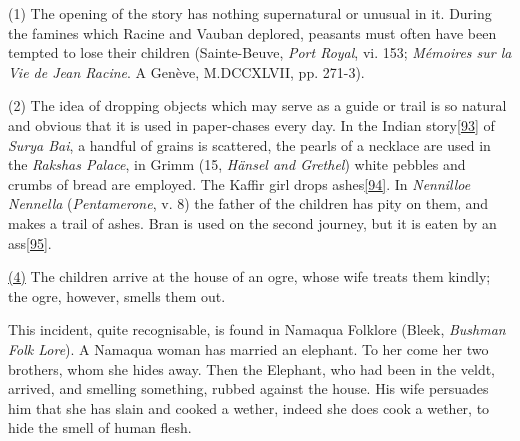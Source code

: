 \documentclass[14pt,a4paper]{memoir}
\newcommand{\ul}[1]{\uline{#1}}
\begin{document}
(1) The opening of the story has nothing supernatural or unusual in it.
During the famines which Racine and Vauban deplored, peasants must often
have been tempted to \textquotesingle lose\textquotesingle{} their
children (Sainte-Beuve, \emph{Port Royal}, vi. 153; \emph{Mémoires sur
la Vie de Jean Racine}. A Genève, M.DCCXLVII, pp. 271-3).

(2) The idea of dropping objects which may serve as a guide or
\textquotesingle trail\textquotesingle{} is so natural and obvious that
it is used in \textquotesingle paper-chases\textquotesingle{} every day.
In the Indian
story\protect\hypertarget{4533318093929944247_33931-h-1.htm.xhtmlux5cux23FNanchor_93}{}{}\protect\hyperlink{4533318093929944247_33931-h-1.htm.xhtmlux5cux23Footnote_93}{{[}93{]}}
of \emph{Surya Bai}, a handful of grains is scattered, the pearls of a
necklace are used in the \emph{Raksha\textquotesingle s Palace}, in
Grimm (15, \emph{Hänsel and Grethel}) white pebbles and crumbs of bread
are employed. The Kaffir girl drops
ashes\protect\hypertarget{4533318093929944247_33931-h-1.htm.xhtmlux5cux23FNanchor_94}{}{}\protect\hyperlink{4533318093929944247_33931-h-1.htm.xhtmlux5cux23Footnote_94}{{[}94{]}}.
In \emph{Nennilloe Nennella} (\emph{Pentamerone}, v. 8) the father of
the children has pity on them, and makes a trail of ashes. Bran is used
on the second journey, but it is eaten by an
ass\protect\hypertarget{4533318093929944247_33931-h-1.htm.xhtmlux5cux23FNanchor_95}{}{}\protect\hyperlink{4533318093929944247_33931-h-1.htm.xhtmlux5cux23Footnote_95}{{[}95{]}}.

\ul{(4)} The children arrive at the house of an ogre, whose wife treats
them kindly; the ogre, however, smells them out.

This incident, quite recognisable, is found in Namaqua Folklore (Bleek,
\emph{Bushman Folk Lore}). A Namaqua woman has married an elephant. To
her come her two brothers, whom she hides away. \textquotesingle Then
the Elephant, who had been in the veldt, arrived, and smelling
something, rubbed against the house.\textquotesingle{} His wife
persuades him that she has slain and cooked a wether, indeed she does
cook a wether, to hide the smell of human flesh.
\end{document}
